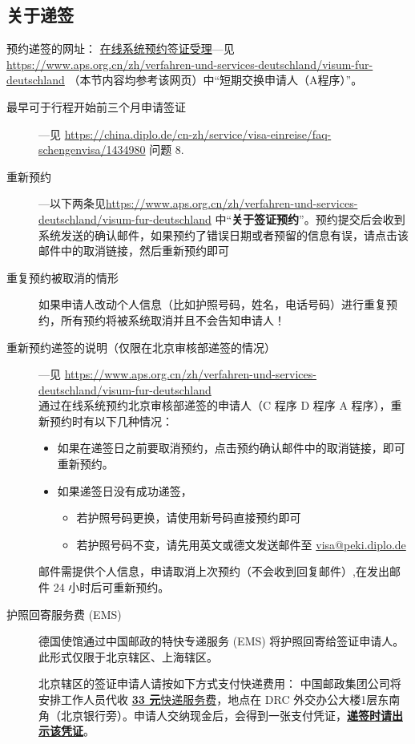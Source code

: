 \documentclass{article}
\begin{document}
\subsection{关于递签}\label{sec:visa}
\sloppy 预约递签的网址： \href{https://service2.diplo.de/rktermin/extern/choose_category.do?locationCode=peki&realmId=12&categoryId=156&request_locale=de}{在线系统预约签证受理}---见 \url{https://www.aps.org.cn/zh/verfahren-und-services-deutschland/visum-fur-deutschland} （本节内容均参考该网页）中“短期交换申请人（A程序）”。
\begin{description}
\item[最早可于行程开始前三个月申请签证] ---见 \url{https://china.diplo.de/cn-zh/service/visa-einreise/faq-schengenvisa/1434980} 问题 8.
\item[重新预约] ---以下两条见\sloppy \url{https://www.aps.org.cn/zh/verfahren-und-services-deutschland/visum-fur-deutschland} 中“\textbf{关于签证预约}”。预约提交后会收到系统发送的确认邮件，如果预约了错误日期或者预留的信息有误，请点击该邮件中的取消链接，然后重新预约即可
\item[重复预约被取消的情形] 如果申请人改动个人信息（比如护照号码，姓名，电话号码）进行重复预约，所有预约将被系统取消并且不会告知申请人！ 
\item[重新预约递签的说明（仅限在北京审核部递签的情况）] ---见 \url{https://www.aps.org.cn/zh/verfahren-und-services-deutschland/visum-fur-deutschland}\\
通过在线系统预约北京审核部递签的申请人（C 程序 D 程序 A 程序），重新预约时有以下几种情况：
\begin{itemize}
\item 如果在递签日之前要取消预约，点击预约确认邮件中的取消链接，即可重新预约。
\item 如果递签日没有成功递签，
\begin{itemize}
  \item 若护照号码更换，请使用新号码直接预约即可
  \item 若护照号码不变，请先用英文或德文发送邮件至 \href{mailto:visa@peki.diplo.de}{visa@peki.diplo.de}
\end{itemize}
\end{itemize}
邮件需提供个人信息，申请取消上次预约（不会收到回复邮件）,在发出邮件 24 小时后可重新预约。
\item[护照回寄服务费 (EMS)]

德国使馆通过中国邮政的特快专递服务 (EMS) 将护照回寄给签证申请人。此形式仅限于北京辖区、上海辖区。

北京辖区的签证申请人请按如下方式支付快递费用：
中国邮政集团公司将安排工作人员代收 \underline{\label{inline-money}\textbf{33 元}快递服务费}，地点在 DRC 外交办公大楼1层东南角（北京银行旁）。申请人交纳现金后，会得到一张支付凭证，\underline{\textbf{递签时请出示该凭证}}。


\end{description}
\end{document}
